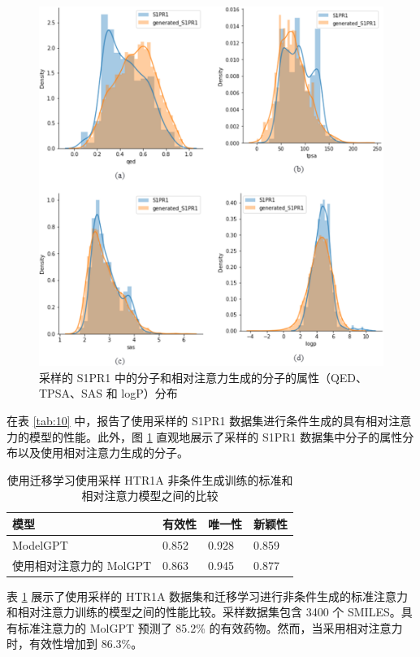 \begin{translation}
\begin{figure}[H]
  \centering
  \includegraphics[width=\linewidth]{figures/7.png}
  \caption{采样的 S1PR1 中的分子和相对注意力生成的分子的属性（QED、TPSA、SAS 和 logP）分布}
  \label{fig:7}
\end{figure}

在表 \ref{tab:10} 中，报告了使用采样的 S1PR1 数据集进行条件生成的具有相对注意力的模型的性能。此外，图 \ref{fig:7} 直观地展示了采样的 S1PR1 数据集中分子的属性分布以及使用相对注意力生成的分子。

\begin{table}[H]
  \centering
  \caption{使用迁移学习使用采样 HTR1A 非条件生成训练的标准和相对注意力模型之间的比较}
  \label{tab:11}
  \begin{tabular}{llll}
    \hline 模型       & 有效性   & 唯一性   & 新颖性   \\
    \hline ModelGPT & 0.852 & 0.928 & 0.859 \\
    使用相对注意力的 MolGPT & 0.863 & 0.945 & 0.877 \\
    \hline
  \end{tabular}
\end{table}

表 \ref{tab:11} 展示了使用采样的 HTR1A 数据集和迁移学习进行非条件生成的标准注意力和相对注意力训练的模型之间的性能比较。采样数据集包含 3400 个 SMILES。具有标准注意力的 MolGPT 预测了 85.2\% 的有效药物。然而，当采用相对注意力时，有效性增加到 86.3\%。


\end{translation}
